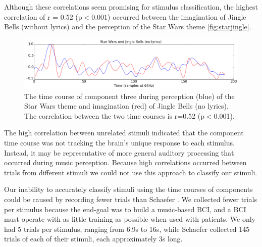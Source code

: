 Although these correlations seem promising for stimulus classification, the highest correlation of r = 0.52 (p$<$0.001) occurred between the imagination of Jingle Bells (without lyrics) and the perception of the Star Wars theme \autoref{fig:starjingle}.
\begin{figure}[htbp]
  \centerline{\includegraphics[scale=0.4]{Figures/TimeCourse-StarJingle}}
  \caption{The time course of component three during perception (blue) of the Star Wars theme and imagination (red) of Jingle Bells (no lyrics). The correlation between the two time courses is r=0.52 (p$<$0.001).}
  \label{fig:starjingle}
\end{figure}
The high correlation between unrelated stimuli indicated that the component time course was not tracking the brain's unique response to each stimulus. 
Instead, it may be representative of more general auditory processing that occurred during music perception.
Because high correlations occurred between trials from different stimuli we could not use this approach to classify our stimuli.

Our inability to accurately classify stimuli using the time courses of components could be caused by recording fewer trials than Schaefer \etal \citeyear{schaefer_name_2011}.
We collected fewer trials per stimulus because the end-goal was to build a music-based BCI, and a BCI must operate with as little training as possible when used with patients. 
We only had 5 trials per stimulus, ranging from 6.9s to 16s, while Schaefer \etal \citeyear{schaefer_name_2011} collected 145 trials of each of their stimuli, each approximately 3s long.